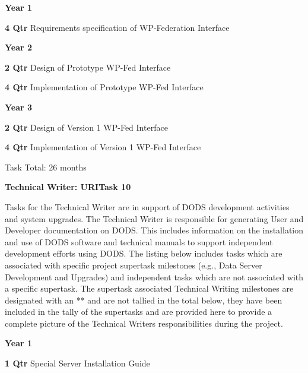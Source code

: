 \documentclass[12pt]{article}
\begin{document}
\begin{description}
 \item{\large \bf Year 1}
   \begin{description}
   \item{\bf 4 Qtr} Requirements specification of WP-Federation Interface 

   \end{description}
 \item{\large \bf Year 2}
   \begin{description}

   \item{\bf 2 Qtr} Design of Prototype WP-Fed Interface


   \item{\bf 4 Qtr} Implementation of Prototype WP-Fed Interface

   \end{description}
 \item{\large \bf Year 3}
   \begin{description}

   \item{\bf 2 Qtr} Design of Version 1 WP-Fed Interface

   \item{\bf 4 Qtr} Implementation of Version 1 WP-Fed Interface 


 Task Total: 26 months


   \end{description}
\begin{center}
{\large \bf Technical Writer: URITask 10}
\end{center}
Tasks for the Technical Writer are in support of
DODS development activities and system upgrades.  The Technical Writer is
responsible for generating User and Developer documentation on DODS.  This
includes information on the installation and use of DODS software and
technical manuals to support independent development efforts using DODS. The
listing below includes tasks which are associated with specific project
supertask milestones (e.g., Data Server Development and Upgrades) and
independent tasks which are not associated with a specific supertask.  The
supertask associated Technical Writing milestones are designated with an **
and are not tallied in the total below, they have been included in the tally
of the supertasks and are provided here to provide a complete picture of the
Technical Writers responsibilities during the project.

 \item{\large \bf Year 1}
   \begin{description}
   \item{\bf 1 Qtr} Special Server Installation Guide


\end{description}
\end{description}
\end{document}
